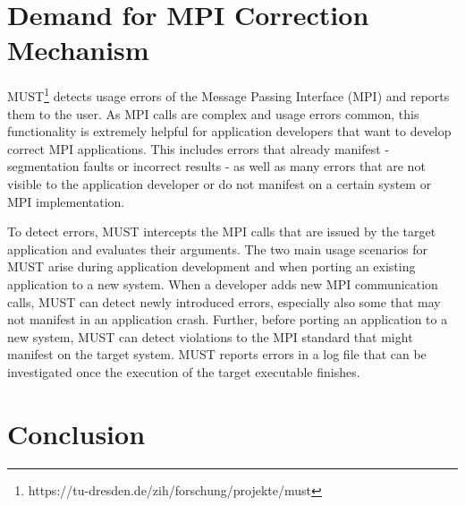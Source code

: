 \section{Demand for MPI Correction Mechanism}

MUST\footnote{https://tu-dresden.de/zih/forschung/projekte/must} detects usage errors of the Message Passing Interface (MPI) and reports them to the user. As MPI calls are complex and usage errors common, this functionality is extremely helpful for application developers that want to develop correct MPI applications. This includes errors that already manifest - segmentation faults or incorrect results - as well as many errors that are not visible to the application developer or do not manifest on a certain system or MPI implementation.

To detect errors, MUST intercepts the MPI calls that are issued by the target application and evaluates their arguments. The two main usage scenarios for MUST arise during application development and when porting an existing application to a new system. When a developer adds new MPI communication calls, MUST can detect newly introduced errors, especially also some that may not manifest in an application crash. Further, before porting an application to a new system, MUST can detect violations to the MPI standard that might manifest on the target system. MUST reports errors in a log file that can be investigated once the execution of the target executable finishes.

\section{Conclusion}

\clearemptydoublepage

\clearemptydoublepage